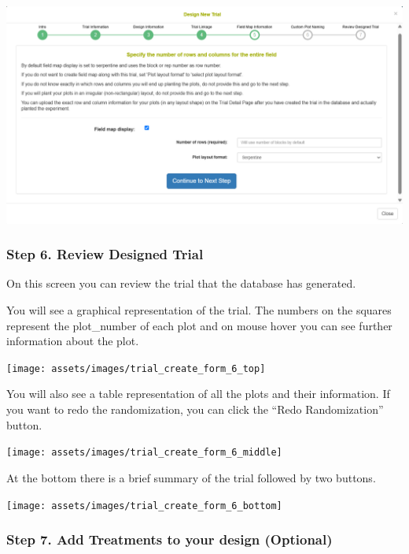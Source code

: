 \documentclass[
  12pt,
]{book}
\begin{document}
\begin{center}\includegraphics[width=0.95\linewidth]{assets/images/trial_create_form_5} \end{center}

\hypertarget{step-6.-review-designed-trial}{%
\subsubsection*{Step 6. Review Designed Trial}\label{step-6.-review-designed-trial}}


On this screen you can review the trial that the database has generated.

You will see a graphical representation of the trial. The numbers on the squares represent the plot\_number of each plot and on mouse hover you can see further information about the plot.

\begin{center}\texttt{[image: assets/images/trial\_create\_form\_6\_top]} \end{center}

You will also see a table representation of all the plots and their information. If you want to redo the randomization, you can click the ``Redo Randomization'' button.

\begin{center}\texttt{[image: assets/images/trial\_create\_form\_6\_middle]} \end{center}

At the bottom there is a brief summary of the trial followed by two buttons.

\begin{center}\texttt{[image: assets/images/trial\_create\_form\_6\_bottom]} \end{center}

\hypertarget{step-7.-add-treatments-to-your-design-optional}{%
\subsubsection*{Step 7. Add Treatments to your design (Optional)}\label{step-7.-add-treatments-to-your-design-optional}}
\end{document}
